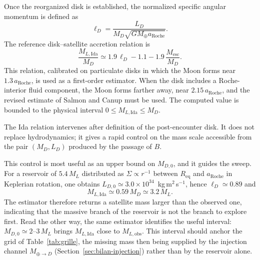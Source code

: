 \documentclass[11pt,a4paper,openany]{report}
\newcommand{\Mt}{M_{\oplus}}
\newcommand{\Req}{R_{\mathrm{eq}}}
\newcommand{\aR}{a_{\mathrm{Roche}}}
\begin{document}
Once the reorganized disk is established, the normalized specific angular momentum is defined as
\begin{equation}
\ell_D=\frac{L_D}{M_D\sqrt{G\Mt\aR}}.
\label{eq:lD}
\end{equation}
The reference disk--satellite accretion relation \cite{Ida1997} is
\begin{equation}
\frac{M_{L,\mathrm{Ida}}}{M_D}\simeq1.9\,\ell_D-1.1-1.9\,\frac{M_{\mathrm{esc}}}{M_D}.
\label{eq:Ida}
\end{equation}
This relation, calibrated on particulate disks in which the Moon forms near $1.3\,\aR$, is used as
a first-order estimator. When the disk includes a Roche-interior fluid component, the Moon forms
farther away, near $2.15\,\aR$, and the revised estimate of Salmon and Canup \cite{SalmonCanup2012}
must be used. The computed value is bounded to the physical interval
$0\le M_{L,\mathrm{Ida}}\le M_D$.

\begin{lecture}
The Ida relation intervenes after definition of the post-encounter disk. It does not replace
hydrodynamics; it gives a rapid control on the mass scale accessible from the pair $(M_D,L_D)$
produced by the passage of $B$.
\end{lecture}

\begin{controle}
This control is most useful as an upper bound on $M_{D,0}$, and it guides the sweep. For a
reservoir of $5.4\,M_L$ distributed as $\Sigma\propto r^{-1}$ between $\Req$ and $\aR$ in Keplerian
rotation, one obtains $L_{D,0}\simeq3.0\times10^{34}$~kg\,m$^2$\,s$^{-1}$, hence
$\ell_D\simeq0.89$ and
\begin{equation}
M_{L,\mathrm{Ida}}\simeq0.59\,M_D\simeq3.2\,M_L.
\label{eq:controle-Ida}
\end{equation}
The estimator therefore returns a satellite mass larger than the observed one, indicating that the
massive branch of the reservoir is not the branch to explore first. Read the other way, the same
estimator identifies the useful interval: $M_{D,0}\simeq2$--$3\,M_L$ brings $M_{L,\mathrm{Ida}}$
close to $M_{L,\mathrm{obs}}$. This interval should anchor the grid of Table~\ref{tab:grille}, the
missing mass then being supplied by the injection channel $M_{\oplus\to D}$
(Section~\ref{sec:bilan-injection}) rather than by the reservoir alone.
\end{controle}
\end{document}
